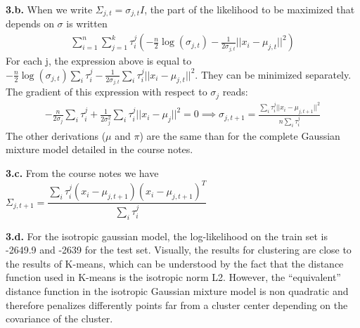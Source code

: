 \documentclass[11pt, oneside]{amsart}   	%
\begin{document}
\textbf{3.b.} When we write $\Sigma_{j, t} = \sigma_{j, t} I$, the part of the likelihood to be maximized that depends on $\sigma$ is written
\begin{align*}
\sum_{i=1}^n \sum_{j=1}^k \tau_i^j\left(-\frac{n}{2}\log(\sigma_{j, t}) - \frac{1}{2\sigma_{j,t}} ||x_i - \mu_{j, t}||^2\right)
\end{align*}
For each j, the expression above is equal to $-\frac{n}{2}\log(\sigma_{j,t})\sum_i \tau_i^j - \frac{1}{2\sigma_{j,t}}\sum_i \tau_i^j ||x_i - \mu_{j,t}||^2$. They can be minimized separately. The gradient of this expression with respect to $\sigma_{j}$ reads: 
\begin{align*}
-\frac{n}{2\sigma_{j}}\sum_i \tau_i^j + \frac{1}{2\sigma_{j}^2} \sum_i\tau_i^j ||x_i - \mu_{j}||^2 = 0 \implies \boxed{\sigma_{j, t+1} = \frac{\sum_i\tau_i^j ||x_i - \mu_{j, t+1}||^2}{n \sum_i \tau_i^j}}
\end{align*}
The other derivations ($\mu$ and $\pi$) are the same than for the complete Gaussian mixture model detailed in the course notes.
\vfill

\textbf{3.c.} From the course notes we have $\boxed{\Sigma_{j,t+1} = \dfrac{\sum_i\tau_i^j(x_i-\mu_{j,t+1})(x_i-\mu_{j,t+1})^T}{ \sum_i\tau_i^j}}$
\vfill

\textbf{3.d.} For the isotropic gaussian model, the log-likelihood on the train set is -2649.9 and -2639 for the test set. Visually, the results for clustering are close to the results of K-means, which can be understood by the fact that the distance function used in K-means is the isotropic norm L2. However, the ``equivalent'' distance function in the isotropic Gaussian mixture model is non quadratic and therefore penalizes differently points far from a cluster center depending on the covariance of the cluster. 
\end{document}
